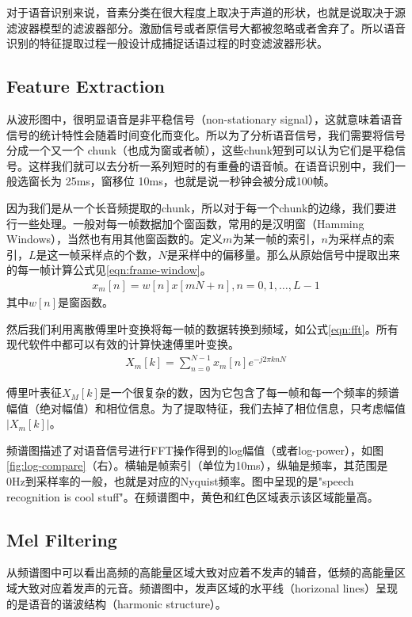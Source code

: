 对于语音识别来说，音素分类在很大程度上取决于声道的形状，也就是说取决于源滤波器模型的滤波器部分。激励信号或者原信号大都被忽略或者舍弃了。所以语音识别的特征提取过程一般设计成捕捉话语过程的时变滤波器形状。

\subsection{Feature Extraction} %
\label{sub:feature_extraction}
从波形图中，很明显语音是非平稳信号（non-stationary signal），这就意味着语音信号的统计特性会随着时间变化而变化。所以为了分析语音信号，我们需要将信号分成一个又一个 chunk（也成为窗或者帧），这些chunk短到可以认为它们是平稳信号。这样我们就可以去分析一系列短时的有重叠的语音帧。在语音识别中，我们一般选窗长为 25ms，窗移位 10ms，也就是说一秒钟会被分成100帧。

因为我们是从一个长音频提取的chunk，所以对于每一个chunk的边缘，我们要进行一些处理。一般对每一帧数据加个窗函数，常用的是汉明窗（Hamming Windows），当然也有用其他窗函数的。定义$m$为某一帧的索引，$n$为采样点的索引，$L$是这一帧采样点的个数，$N$是采样中的偏移量。那么从原始信号中提取出来的每一帧计算公式见\ref{eqn:frame-window}。
\begin{align}
\label{eqn:frame-window}
	x_{m}[n]=w[n] x[m N+n], n=0,1, \ldots, L-1
\end{align}
其中$w[n]$是窗函数。

然后我们利用离散傅里叶变换将每一帧的数据转换到频域，如公式\ref{eqn:fft}。所有现代软件中都可以有效的计算快速傅里叶变换。
\begin{align}
\label{eqn:fft}
	X_{m}[k]=\sum_{n=0}^{N-1} x_{m}[n] e^{-j 2 \pi k n N}
\end{align}

傅里叶表征$X_{M} [k]$是一个很复杂的数，因为它包含了每一帧和每一个频率的频谱幅值（绝对幅值）和相位信息。为了提取特征，我们去掉了相位信息，只考虑幅值 $|X_{m}[k]|$。

频谱图描述了对语音信号进行FFT操作得到的log幅值（或者log-power），如图\ref{fig:log-compare}（右）。横轴是帧索引（单位为10ms），纵轴是频率，其范围是0Hz到采样率的一般，也就是对应的Nyquist频率。图中呈现的是"speech recognition is cool stuff"。在频谱图中，黄色和红色区域表示该区域能量高。

\subsection{Mel Filtering} %
\label{sub:mel_filtering}
从频谱图中可以看出高频的高能量区域大致对应着不发声的辅音，低频的高能量区域大致对应着发声的元音。频谱图中，发声区域的水平线（horizonal lines）呈现的是语音的谐波结构（harmonic structure）。

